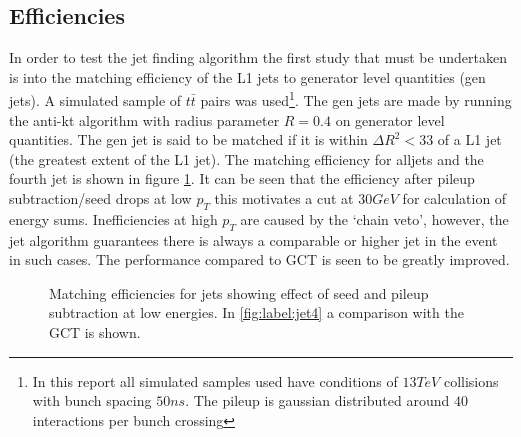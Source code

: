 \subsection{Efficiencies}
In order to test the jet finding algorithm the first study that must be undertaken is into the matching efficiency of the L1 jets to generator level quantities (gen jets). A simulated sample of $t\bar{t}$ pairs was used\footnote{In this report all simulated samples used have conditions of $13TeV$ collisions with bunch spacing $50ns$. The pileup is gaussian distributed around $40$ interactions per bunch crossing}. The gen jets are made by running the anti-kt algorithm with radius parameter $R=0.4$ on generator level quantities. The gen jet is said to be matched if it is within ${\Delta R}^2<33$ of a L1 jet (the greatest extent of the L1 jet). The matching efficiency for alljets and the fourth jet is shown in figure \ref{match}. It can be seen that the efficiency after pileup subtraction/seed drops at low $p_T$ this motivates a cut at $30GeV$ for calculation of energy sums. Inefficiencies at high $p_T$ are caused by the `chain veto', however, the jet algorithm guarantees there is always a comparable or higher jet in the event in such cases. The performance compared to GCT is seen to be greatly improved.  
\begin{figure}
\hfill
{}
\hfill
{}
\hfill
\caption{Matching efficiencies for jets showing effect of seed and pileup subtraction at low energies. In \ref{fig:label:jet4} a comparison with the GCT is shown.}
\label{match}
\end{figure}
